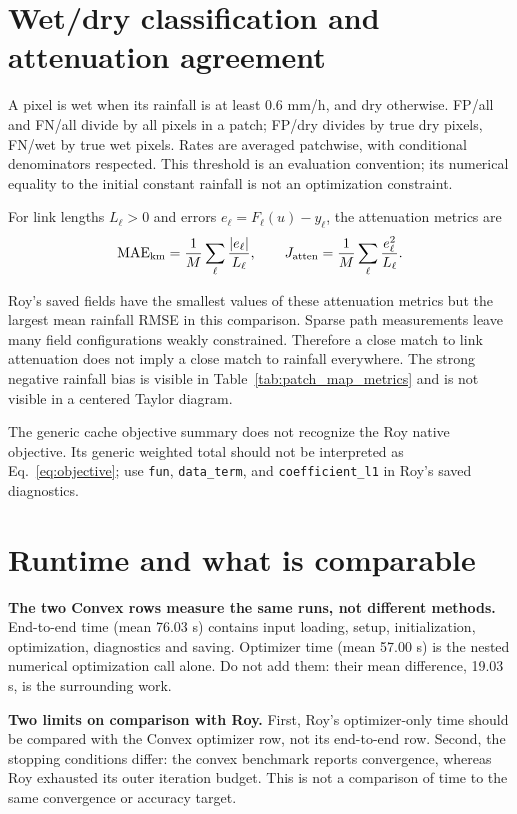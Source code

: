 \documentclass[11pt,a4paper]{article}
\begin{document}
\section{Wet/dry classification and attenuation agreement}
A pixel is wet when its rainfall is at least 0.6 mm/h, and dry otherwise. FP/all and FN/all divide by all pixels in a patch; FP/dry divides by true dry pixels, FN/wet by true wet pixels. Rates are averaged patchwise, with conditional denominators respected. This threshold is an evaluation convention; its numerical equality to the initial constant rainfall is not an optimization constraint.

For link lengths $L_\ell>0$ and errors $e_\ell=F_\ell(u)-y_\ell$, the attenuation metrics are
\[
 \mathrm{MAE}_{\rm km}=\frac1M\sum_\ell\frac{|e_\ell|}{L_\ell},\qquad
 J_{\rm atten}=\frac1M\sum_\ell\frac{e_\ell^2}{L_\ell}.
\]

Roy's saved fields have the smallest values of these attenuation metrics but the largest mean rainfall RMSE in this comparison. Sparse path measurements leave many field configurations weakly constrained. Therefore a close match to link attenuation does not imply a close match to rainfall everywhere. The strong negative rainfall bias is visible in Table~\ref{tab:patch_map_metrics} and is not visible in a centered Taylor diagram.

The generic cache objective summary does not recognize the Roy native objective. Its generic weighted total should not be interpreted as Eq.~\eqref{eq:objective}; use \texttt{fun}, \texttt{data\_term}, and \texttt{coefficient\_l1} in Roy's saved diagnostics.
\clearpage
\section{Runtime and what is comparable}
\begin{table}[H]\centering\small
\caption{Saved runtime records for the same 100 patch identifiers. Per-patch mean, median and range are in seconds; total is in hours. Missing timings are not estimated.}\end{table}
\textbf{The two Convex rows measure the same runs, not different methods.} End-to-end time (mean 76.03 s) contains input loading, setup, initialization, optimization, diagnostics and saving. Optimizer time (mean 57.00 s) is the nested numerical optimization call alone. Do not add them: their mean difference, 19.03 s, is the surrounding work.

\textbf{Two limits on comparison with Roy.} First, Roy's optimizer-only time should be compared with the Convex optimizer row, not its end-to-end row. Second, the stopping conditions differ: the convex benchmark reports convergence, whereas Roy exhausted its outer iteration budget. This is not a comparison of time to the same convergence or accuracy target.
\end{document}
